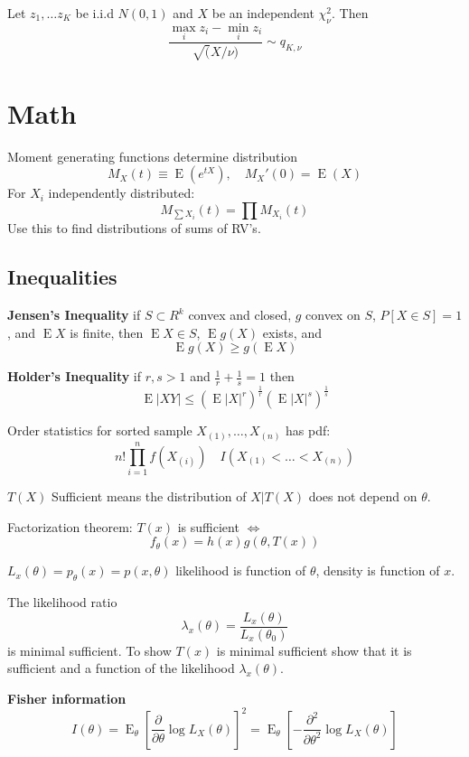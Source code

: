 \documentclass[10pt, twocolumn]{article}
\newcommand{\Expect}{\operatorname{E}}
\begin{document}
Let $z_1, \dots z_K$ be i.i.d $N(0, 1)$ and
$X$ be an independent $\chi^2_\nu$. Then
\[
    \frac{\max_i z_i - \min_i z_i}{\sqrt(X / \nu)} \sim q_{K, \nu}
\]



\newpage
\section{Math}

Moment generating functions determine distribution
\[
    M_X(t) \equiv \Expect (e^{tX}),
    \quad M_X'(0) = \Expect(X)
\]
For $X_i$ independently distributed:
\[
    M_{\sum X_i} (t) = \prod M_{X_i} (t)
\]
Use this to find distributions of sums of RV's.

\subsection{Inequalities}

\textbf{Jensen's Inequality} if $S \subset R^k$ convex and closed, $g$ convex on $S$, $P[X
\in S] = 1$, and $\Expect X$ is finite, then $\Expect X \in S$, $\Expect
g(X)$ exists, and
\[
    \Expect g(X) \geq g(\Expect X)
\]

\textbf{Holder's Inequality} if $r, s > 1$ and $\frac{1}{r} + \frac{1}{s} =
1$ then
\[
    \Expect |XY| \leq (\Expect |X|^r)^{\frac{1}{r}}(\Expect |X|^s)^{\frac{1}{s}}
\]


Order statistics for sorted sample $X_{(1)}, \dots, X_{(n)}$ has pdf:
\[
    n! \prod_{i=1}^n f(X_{(i)}) \quad I(X_{(1)} < \dots < X_{(n)})
\]

$T(X)$ Sufficient means the distribution of $X | T(X)$ does not depend on
$\theta$.

Factorization theorem: $T(x)$ is sufficient $\iff$
\[
    f_{\theta}(x) = h(x) g(\theta, T(x))
\]

$L_x (\theta) = p_\theta (x) = p(x, \theta)$ likelihood is function of
$\theta$, density is function of $x$.

The likelihood ratio
\[
    \lambda_x (\theta) = \frac{L_x (\theta)}{L_x (\theta_0)}
\]
is minimal sufficient. To show $T(x)$ is minimal sufficient show that it is
sufficient and a function of the likelihood $\lambda_x (\theta)$.

\textbf{Fisher information}
\[
    I(\theta) = \Expect_\theta \left[ \frac{\partial}{\partial \theta} 
    \log L_X (\theta) \right]^2
    = \Expect_\theta \left[ - \frac{\partial^2}{\partial \theta^2}
    \log L_X (\theta) \right]
\]
\end{document}
